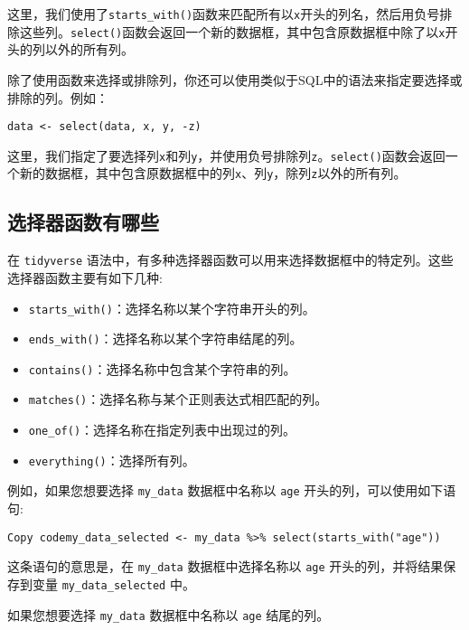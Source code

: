 \documentclass[
  letterpaper,
  DIV=11,
  numbers=noendperiod]{scrreprt}
\providecommand{\tightlist}{%
  \setlength{\itemsep}{0pt}\setlength{\parskip}{0pt}}\usepackage{longtable,booktabs,array}
\begin{document}
这里，我们使用了\texttt{starts\_with()}函数来匹配所有以\texttt{x}开头的列名，然后用负号排除这些列。\texttt{select()}函数会返回一个新的数据框，其中包含原数据框中除了以\texttt{x}开头的列以外的所有列。

除了使用函数来选择或排除列，你还可以使用类似于SQL中的语法来指定要选择或排除的列。例如：

\begin{verbatim}
data <- select(data, x, y, -z)
\end{verbatim}

这里，我们指定了要选择列\texttt{x}和列\texttt{y}，并使用负号排除列\texttt{z}。\texttt{select()}函数会返回一个新的数据框，其中包含原数据框中的列\texttt{x}、列\texttt{y}，除列\texttt{z}以外的所有列。

\hypertarget{ux9009ux62e9ux5668ux51fdux6570ux6709ux54eaux4e9b}{%
\subsection{选择器函数有哪些}\label{ux9009ux62e9ux5668ux51fdux6570ux6709ux54eaux4e9b}}

在 \texttt{tidyverse}
语法中，有多种选择器函数可以用来选择数据框中的特定列。这些选择器函数主要有如下几种:

\begin{itemize}
\tightlist
\item
  \texttt{starts\_with()}：选择名称以某个字符串开头的列。
\item
  \texttt{ends\_with()}：选择名称以某个字符串结尾的列。
\item
  \texttt{contains()}：选择名称中包含某个字符串的列。
\item
  \texttt{matches()}：选择名称与某个正则表达式相匹配的列。
\item
  \texttt{one\_of()}：选择名称在指定列表中出现过的列。
\item
  \texttt{everything()}：选择所有列。
\end{itemize}

例如，如果您想要选择 \texttt{my\_data} 数据框中名称以 \texttt{age}
开头的列，可以使用如下语句:

\begin{verbatim}
Copy codemy_data_selected <- my_data %>% select(starts_with("age"))
\end{verbatim}

这条语句的意思是，在 \texttt{my\_data} 数据框中选择名称以 \texttt{age}
开头的列，并将结果保存到变量 \texttt{my\_data\_selected} 中。

如果您想要选择 \texttt{my\_data} 数据框中名称以 \texttt{age} 结尾的列。
\end{document}

